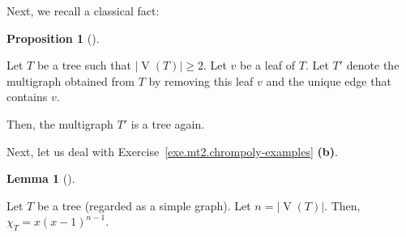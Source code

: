 \documentclass[numbers=enddot,12pt,final,onecolumn,notitlepage]{scrartcl}%
\theoremstyle{definition}
\newtheorem{lem}[theo]{Lemma}
\newenvironment{lemma}[1][]
{\begin{lem}[#1]\begin{leftbar}}
{\end{leftbar}\end{lem}}
\newtheorem{prop}[theo]{Proposition}
\newenvironment{proposition}[1][]
{\begin{prop}[#1]\begin{leftbar}}
{\end{leftbar}\end{prop}}
\newcommand{\abs}[1]{\left| #1 \right|}
\newcommand{\tup}[1]{\left( #1 \right)}
\newcommand{\verts}[1]{\operatorname{V}\left( #1 \right)}
\begin{document}
Next, we recall a classical fact:

\begin{proposition} \label{prop.hw3.tree-leaf.a}
Let $T$ be a tree such that $\abs{\verts{T}} \geq 2$.
Let $v$ be a leaf of $T$.
Let $T'$ denote the multigraph obtained from $T$ by
removing this leaf $v$ and the unique edge that contains $v$.

Then, the multigraph $T'$ is a tree again.
\end{proposition}

Next, let us deal with
Exercise~\ref{exe.mt2.chrompoly-examples} \textbf{(b)}.

\begin{lemma} \label{lem.mt2.chrompoly-examples.b}
Let $T$ be a tree (regarded as a simple graph).
Let $n = \abs{\verts{T}}$.
Then, $\chi_T = x \tup{x-1}^{n-1}$.
\end{lemma}
\end{document}
